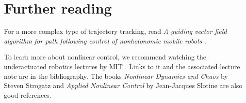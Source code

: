 \section{Further reading}

For a more complex type of trajectory tracking, read \textit{A guiding vector
field algorithm for path following control of nonholonomic mobile robots}
\cite{bib:gvf}.

To learn more about nonlinear control, we recommend watching the underactuated
robotics lectures by MIT \cite{bib:underactuated_videos}. Links to it and the
associated lecture note \cite{bib:underactuated_book} are in the bibliography.
The books \textit{Nonlinear Dynamics and Chaos} by Steven Strogatz and
\textit{Applied Nonlinear Control} by Jean-Jacques Slotine are also good
references.

